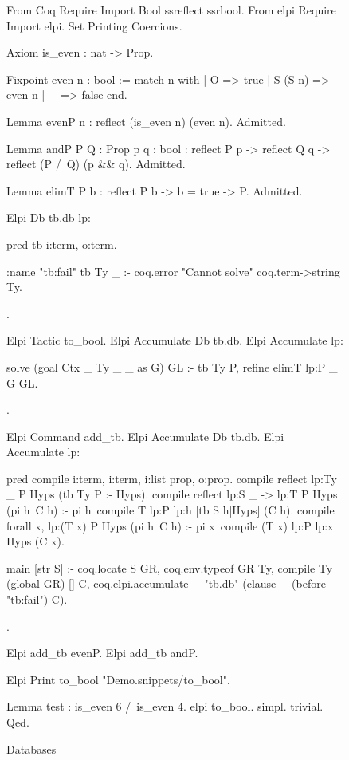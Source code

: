 \documentclass[a4paper, 11pt]{book}
\begin{document}
\begin{figure}
  \begin{coqcode}
    From Coq Require Import Bool ssreflect ssrbool.
From elpi Require Import elpi.
Set Printing Coercions.

Axiom is_even : nat -> Prop.

Fixpoint even n : bool :=
  match n with
  | O => true
  | S (S n) => even n
  | _ => false
  end.

Lemma evenP n : reflect (is_even n) (even n).
Admitted.

Lemma andP  {P Q : Prop} {p q : bool} :
  reflect P p -> reflect Q q ->
    reflect (P /\ Q) (p && q).
Admitted.

Lemma elimT {P b} :
  reflect P b -> b = true ->
    P.
Admitted.

Elpi Db tb.db lp:{{
pred tb i:term, o:term.

:name "tb:fail"
tb Ty _ :- coq.error "Cannot solve" {coq.term->string Ty}.

}}.

Elpi Tactic to_bool.
Elpi Accumulate Db tb.db.
Elpi Accumulate lp:{{

solve (goal Ctx _ Ty _ _ as G) GL :-
  tb Ty P,
  refine {{ elimT lp:P _ }} G GL.

}}.

Elpi Command add_tb.
Elpi Accumulate Db tb.db.
Elpi Accumulate lp:{{

%
%

%
%

pred compile i:term, i:term, i:list prop, o:prop.
compile {{ reflect lp:Ty _ }} P Hyps (tb Ty P :- Hyps).
compile {{ reflect lp:S _ -> lp:T }} P Hyps (pi h\ C h) :-
  pi h\
    compile T {{ lp:P lp:h }} [tb S h|Hyps] (C h).
compile {{ forall x, lp:(T x) }} P Hyps (pi h\ C h) :-
  pi x\
    compile (T x) {{ lp:P lp:x }} Hyps (C x).
    
main [str S] :-
  coq.locate S GR,
  coq.env.typeof GR Ty,
  compile Ty (global GR) [] C,
  coq.elpi.accumulate _ "tb.db" (clause _ (before "tb:fail") C).

}}.

Elpi add_tb evenP.
Elpi add_tb andP.

Elpi Print to_bool "Demo.snippets/to_bool".


Lemma test : is_even 6 /\ is_even 4.
elpi to_bool.
simpl.
trivial.
Qed.

  \end{coqcode}
  \caption[Databases]{Databases\label{databases}}
  \end{figure}
\end{document}
